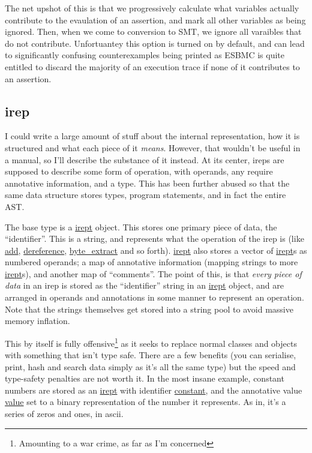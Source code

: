 \documentclass{article}
\begin{document}
The net upshot of this is that we progressively calculate what variables
actually contribute to the evaulation of an assertion, and mark all other
variables as being ignored. Then, when we come to conversion to SMT, we ignore
all varaibles that do not contribute. Unfortuantey this option is turned on by
default, and can lead to significantly confusing counterexamples being printed
as ESBMC is quite entitled to discard the majority of an execution trace if
none of it contributes to an assertion.

\subsection{irep}

I could write a large amount of stuff about the internal representation,
how it is structured and what each piece of it \textit{means}. However, that
wouldn't be useful in a manual, so I'll describe the substance of it instead.
At its center, ireps are supposed to describe some form of operation, with
operands, any require annotative information, and a type. This has been further
abused so that the same data structure stores types, program statements, and
in fact the entire AST.

The base type is a \url{irept} object. This stores one primary piece of data,
the ``identifier''. This is a string, and represents what the operation of
the irep is (like \url{add}, \url{dereference}, \url{byte\_extract} and so
forth). \url{irept} also stores a vector of \url{irept}s as numbered operands;
a map of annotative information (mapping strings to more \url{irept}s), and
another map of ``comments''. The point of this, is that \textit{every piece of
data} in an irep is stored as the ``identifier'' string in an \url{irept}
object, and are arranged in operands and annotations in some manner to represent
an operation. Note that the strings themselves get stored into a string pool
to avoid massive memory inflation.

This by itself is fully offensive\footnote{Amounting to a war crime, as far as
I'm concerned} as it seeks to replace normal classes and objects with something
that isn't type safe. There are a few benefits (you can serialise, print, hash
and search data simply as it's all the same type) but the speed and type-safety
penalties are not worth it. In the most insane example, constant numbers are
stored as an \url{irept} with identifier \url{constant}, and the annotative
value \url{value} set to a binary representation of the number it represents.
As in, it's a series of zeros and ones, in ascii.
\end{document}
